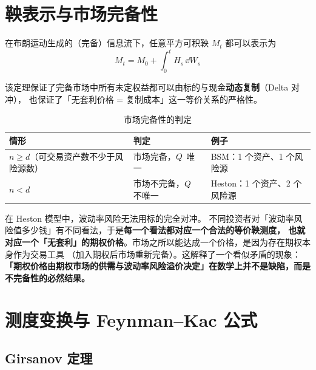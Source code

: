 \section{鞅表示与市场完备性}

\begin{theorem}[鞅表示定理]\label{thm:10-mrt}
在布朗运动生成的（完备）信息流下，任意平方可积鞅 $M_t$ 都可以表示为
\begin{equation}
  M_t = M_0+\int_0^{t}H_s\,\dd W_s
  \label{eq:10-mrt}
\end{equation}
\end{theorem}

该定理保证了完备市场中所有未定权益都可以由标的与现金\textbf{动态复制}（Delta 对冲），
也保证了「无套利价格 = 复制成本」这一等价关系的严格性。

\begin{table}[htbp]
\centering
\caption{市场完备性的判定}\label{tab:10-complete}
\tablefont
\begin{tabularx}{\textwidth}{@{}L{2.6cm}Y L{4.0cm}@{}}
\toprule
\textbf{情形} & \textbf{判定} & \textbf{例子} \\
\midrule
$n\ge d$（可交易资产数不少于风险源数） & 市场完备，$Q$ 唯一 & BSM：1 个资产、1 个风险源 \\
$n<d$ & 市场不完备，$Q$ 不唯一 & Heston：1 个资产、2 个风险源 \\
\bottomrule
\end{tabularx}
\end{table}

\begin{intuitionbox}[不完备市场为什么会给出一段价格区间]
在 Heston 模型中，波动率风险无法用标的完全对冲。
不同投资者对「波动率风险值多少钱」有不同看法，于是\textbf{每一个看法都对应一个合法的等价鞅测度，
也就对应一个「无套利」的期权价格}。市场之所以能达成一个价格，是因为存在期权本身作为交易工具
（加入期权后市场重新完备）。这解释了一个看似矛盾的现象：
\textbf{「期权价格由期权市场的供需与波动率风险溢价决定」在数学上并不是缺陷，而是不完备性的必然结果。}
\end{intuitionbox}

\section{测度变换与 Feynman--Kac 公式}

\subsection{Girsanov 定理}

